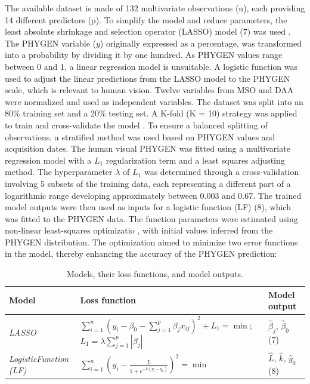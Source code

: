 \documentclass[12pt,a4paper,oneside]{report}
\begin{document}
The available dataset is made of 132 multivariate observations (n), each providing 14 different predictors (p). To simplify the model and reduce parameters, the least absolute shrinkage and selection operator (LASSO) model (7) was used 
\cite{hastieElementsStatisticalLearning2009}.
The PHYGEN variable ($y$) originally expressed as a percentage, was transformed into a probability by dividing it by one hundred. As PHYGEN values range between 0 and 1, a linear regression model is unsuitable. A logistic function was used to adjust the linear predictions from the LASSO model to the PHYGEN scale, which is relevant to human vision.
Twelve variables from MSO and DAA were normalized and used as independent variables. The dataset was split into an 80\% training set and a 20\% testing set. A K-fold (K = 10) strategy was applied to train and cross-validate the model
\cite{jamesIntroductionStatisticalLearning2023}.
To ensure a balanced splitting of observations, a stratified method was used based on PHYGEN values and acquisition dates. The human visual PHYGEN was fitted using a multivariate regression model with a 
$L_1$ regularization term \cite{friedmanRegularizationPathsGeneralized2010} and a least squares adjusting method.
The hyperparameter $\lambda$ of $L_1$ was determined through a cross-validation involving 5 subsets of the training data, each representing a different part of a logarithmic range developing approximately between 0.003 and 0.67. The trained model outputs were then used as inputs for a logistic function (LF) (8), which was fitted to the PHYGEN data. The function parameters were estimated using non-linear least-squares optimizatio
\cite{garbowMINPACK1SubroutineLibrary1984,stornDifferentialEvolutionSimple1997},
with initial values inferred from the PHYGEN distribution. The optimization aimed to minimize two error functions in the model, thereby enhancing the accuracy of the PHYGEN prediction:

\begin{table}[H]
    \centering
    \caption{Models, their loss functions, and model outputs.}
    \begin{tabularx}{\textwidth}{p{3cm}p{6cm}p{3cm}}
    \toprule
    \textbf{Model} & \textbf{Loss function} & \textbf{Model output} \\
    \midrule
    \textit{LASSO} & $\sum_{i=1}^{n} \left( y_i - \beta_0 - \sum_{j=1}^{p} \beta_j x_{ij} \right)^2 + L_1 = \min$; $L_1 = \lambda \sum_{j=1}^{p} |\beta_j|$ & $\hat{\beta}_j$, $\hat{\beta}_0$ (7) \\
    \textit{LogisticFunction (LF)} & $\sum_{i=1}^{n} \left( y_i - \frac{L}{1 + e^{-k(\hat{y}_i - y_0)}} \right)^2 = \min$ & $\hat{L}$, $\hat{k}$, $\hat{y}_0$ (8) \\
    \bottomrule
    \end{tabularx}
    \label{tab:models}
\end{table}
\end{document}

